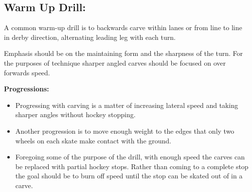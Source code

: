 \subsection*{Warm Up Drill:}
A common warm-up drill is to backwards carve within lanes or from line to line in derby direction, alternating leading leg with each turn.    

Emphasis should be on the maintaining form and the sharpness of the turn. For the purposes of technique sharper angled carves should be focused on over forwards speed. 


{\bf Progressions:}

\begin{itemize}
    \item Progressing with carving is a matter of increasing lateral speed and taking sharper angles without hockey stopping. 
    \item  Another progression is to move enough weight to the edges that only two wheels on each skate make contact with the ground.
    \item Foregoing some of the purpose of the drill, with enough speed the carves can be replaced with partial hockey stops. Rather than coming to a complete stop the goal should be to burn off speed until the stop can be skated out of in a carve.    
\end{itemize}



